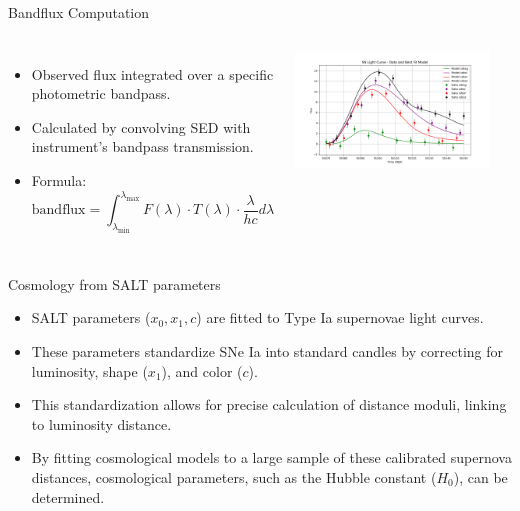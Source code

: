 \documentclass[aspectratio=169]{beamer}
\begin{document}
\begin{frame}{Bandflux Computation}
  \begin{columns}
      \begin{itemize}
        \item Observed flux integrated over a specific photometric bandpass.
        \item Calculated by convolving SED with instrument's bandpass transmission.
        \item Formula:
          \begin{equation*}
            \text{bandflux} = \int_{\lambda_{\text{min}}}^{\lambda_{\text{max}}} F(\lambda) \cdot T(\lambda) \cdot \frac{\lambda}{hc} d\lambda
          \end{equation*}
      \end{itemize}
      \centering
      \includegraphics[width=0.9\textwidth]{images/sncosmo-fitter.png}
  \end{columns}
\end{frame}

\begin{frame}{Cosmology from SALT parameters}
  \begin{itemize}
    \item SALT parameters ($x_0, x_1, c$) are fitted to Type Ia supernovae light curves.
    \item These parameters standardize SNe Ia into standard candles by correcting for luminosity, shape ($x_1$), and color ($c$).
    \item This standardization allows for precise calculation of distance moduli, linking to luminosity distance.
    \item By fitting cosmological models to a large sample of these calibrated supernova distances, cosmological parameters, such as the Hubble constant ($H_0$), can be determined.
  \end{itemize}
\end{frame}
\end{document}
